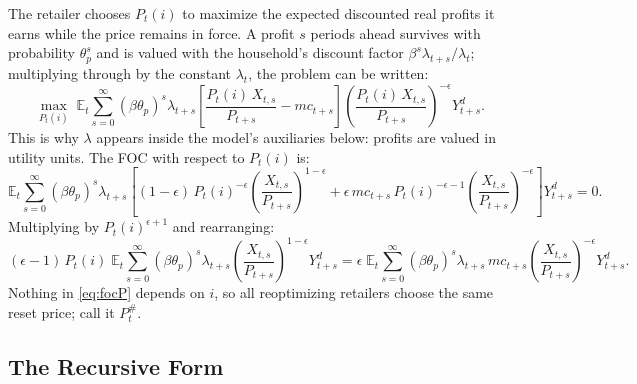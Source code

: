 \documentclass[11pt]{article}
\begin{document}
The retailer chooses $P_t(i)$ to maximize the expected discounted real profits it
earns while the price remains in force. A profit $s$ periods ahead survives with
probability $\theta_p^{s}$ and is valued with the household's discount factor
$\beta^{s}\lambda_{t+s}/\lambda_t$; multiplying through by the constant
$\lambda_t$, the problem can be written:
\begin{equation*}
    \max_{P_t(i)} \; \mathbb{E}_t \sum_{s=0}^{\infty}
    \left(\beta\theta_p\right)^{s} \lambda_{t+s}
    \left[\frac{P_t(i)\,X_{t,s}}{P_{t+s}} - mc_{t+s}\right]
    \left(\frac{P_t(i)\,X_{t,s}}{P_{t+s}}\right)^{-\epsilon} Y_{t+s}^{d}.
\end{equation*}
This is why $\lambda$ appears inside the model's auxiliaries below: profits are
valued in utility units. The FOC with respect to $P_t(i)$ is:
\begin{equation*}
    \mathbb{E}_t \sum_{s=0}^{\infty} \left(\beta\theta_p\right)^{s} \lambda_{t+s}
    \left[(1-\epsilon)\,P_t(i)^{-\epsilon}
    \left(\frac{X_{t,s}}{P_{t+s}}\right)^{1-\epsilon}
    + \epsilon\, mc_{t+s}\,P_t(i)^{-\epsilon-1}
    \left(\frac{X_{t,s}}{P_{t+s}}\right)^{-\epsilon}\right] Y_{t+s}^{d} = 0.
\end{equation*}
Multiplying by $P_t(i)^{\epsilon+1}$ and rearranging:
\begin{equation}\label{eq:focP}
    (\epsilon-1)\,P_t(i)\;\mathbb{E}_t \sum_{s=0}^{\infty}
    \left(\beta\theta_p\right)^{s} \lambda_{t+s}
    \left(\frac{X_{t,s}}{P_{t+s}}\right)^{1-\epsilon} Y_{t+s}^{d}
    = \epsilon\;\mathbb{E}_t \sum_{s=0}^{\infty}
    \left(\beta\theta_p\right)^{s} \lambda_{t+s}\, mc_{t+s}
    \left(\frac{X_{t,s}}{P_{t+s}}\right)^{-\epsilon} Y_{t+s}^{d}.
\end{equation}
Nothing in \eqref{eq:focP} depends on $i$, so all reoptimizing retailers choose the
same reset price; call it $P_t^{\#}$.

\subsection{The Recursive Form}
\end{document}
